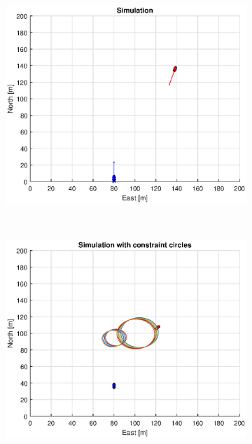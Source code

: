 \begin{figure}[!b]
\begin{subfigure}[b]{0.499\textwidth}
        \centering
        \includegraphics[width=\textwidth]{Images/Figures/sving_GW/Simple0_f600_Frame2}
    \end{subfigure}
    \hfill
    \\
    \begin{subfigure}[b]{0.49\textwidth}
        \centering
        \includegraphics[width=\textwidth]{Images/Figures/sving_GW/Simple0_f1_Frame3}
    \end{subfigure}
    \hfill
    \begin{subfigure}[b]{0.499\textwidth}

\end{subfigure}
\end{figure}
